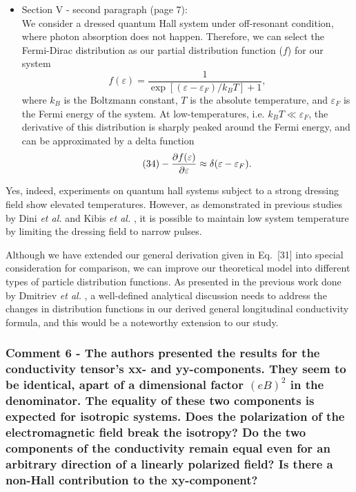 \documentclass{article}
\begin{document}
\begin{itemize}
  \item Section V - second paragraph (page 7):\\
  {\color{Red}
  We consider a dressed quantum Hall system under off-resonant condition, where photon absorption does not happen. Therefore, we can select the Fermi-Dirac distribution as our partial distribution function ($f$) for our system
  \begin{equation} \tag{33}
    f(\varepsilon) = \frac{1}{\exp[(\varepsilon - \varepsilon_F)/k_B T]+1},
  \end{equation}
  where $k_B$ is the Boltzmann constant, $T$ is the absolute temperature, and $\varepsilon_F$ is the Fermi energy of the system. At low-temperatures, i.e. $k_BT \ll \varepsilon_F$, the derivative of this distribution is sharply peaked around the Fermi energy, and can be approximated by a delta function \cite{endo09}
  \begin{equation} \tag{34}
    - \pdv{f(\varepsilon)}{\varepsilon} \approx \delta(\varepsilon - \varepsilon_F).
  \end{equation}
  }
\end{itemize}

Yes, indeed, experiments on quantum hall systems subject to a strong dressing field show elevated temperatures. However, as demonstrated in previous studies by Dini \textit{et al.} \cite{dini16} and Kibis \textit{et al.} \cite{kibis15}, it is possible to maintain low system temperature by limiting the dressing field to narrow pulses.

Although we have extended our general derivation given in Eq.~[31] into special consideration for comparison, we can improve our theoretical model into different types of particle distribution functions. As presented in the previous work done by Dmitriev \textit{et al.} \cite{dmitriev05}, a well-defined analytical discussion needs to address the changes in distribution functions in our derived general longitudinal conductivity formula, and this would be a noteworthy extension to our study.

\subsubsection*{Comment 6 -
\color{RoyalBlue} The authors presented the results for the conductivity tensor's xx- and yy-components. They seem to be identical, apart of a dimensional factor $(eB)^2$ in the denominator. The equality of these two components is expected for isotropic systems. Does the polarization of the electromagnetic field break the isotropy? Do the two components of the conductivity remain equal even for an arbitrary direction of a linearly polarized field? Is there a non-Hall contribution to the xy-component?
}
\end{document}
